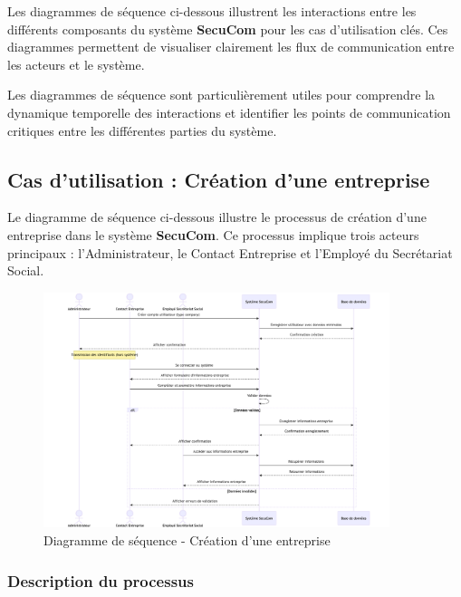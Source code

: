 \noindent Les diagrammes de séquence ci-dessous illustrent les interactions entre les différents composants du système \textbf{SecuCom} pour les cas d'utilisation clés. Ces diagrammes permettent de visualiser clairement les flux de communication entre les acteurs et le système.

\begin{note}
Les diagrammes de séquence sont particulièrement utiles pour comprendre la dynamique temporelle des interactions et identifier les points de communication critiques entre les différentes parties du système.
\end{note}

\subsection{Cas d'utilisation : Création d'une entreprise}

\noindent Le diagramme de séquence ci-dessous illustre le processus de création d'une entreprise dans le système \textbf{SecuCom}. Ce processus implique trois acteurs principaux : l'Administrateur, le Contact Entreprise et l'Employé du Secrétariat Social.

\begin{figure}[H]
\centering
\includegraphics[width=0.9\textwidth]{SD_creation_entreprise.png}
\caption{Diagramme de séquence - Création d'une entreprise}
\end{figure}

\vspace{0.5cm}

\subsubsection{Description du processus}

